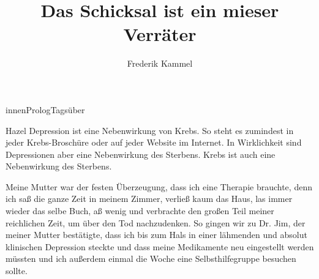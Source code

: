 \documentclass[12pt]{article}
\title{Das Schicksal ist ein mieser Verräter}
\author{Frederik Kammel}
\begin{document}
    


    \begin{scene}[fade in]{innen}{Prolog}{Tagsüber}
        \begin{dialog}[V.O.]{Hazel}
            Depression ist eine Nebenwirkung von Krebs.
            So steht es zumindest in jeder Krebs-Broschüre oder auf jeder Website im Internet.
            In Wirklichkeit sind Depressionen aber eine Nebenwirkung des Sterbens.
            Krebs ist auch eine Nebenwirkung des Sterbens.

            \pause

            Meine Mutter war der festen Überzeugung, dass ich eine Therapie brauchte, denn ich saß die ganze Zeit in
            meinem Zimmer, verließ kaum das Haus, las immer wieder das selbe Buch, aß wenig und verbrachte den großen
            Teil meiner reichlichen Zeit, um über den Tod nachzudenken.
            So gingen wir zu \gls{Dr. Jim}, der meiner Mutter bestätigte, dass ich bis zum Hals in einer lähmenden und absolut
            klinischen Depression steckte und dass meine Medikamente neu eingestellt werden müssten und ich außerdem
            einmal die Woche eine Selbsthilfegruppe besuchen sollte.
        \end{dialog}
    \end{scene}
\end{document}
